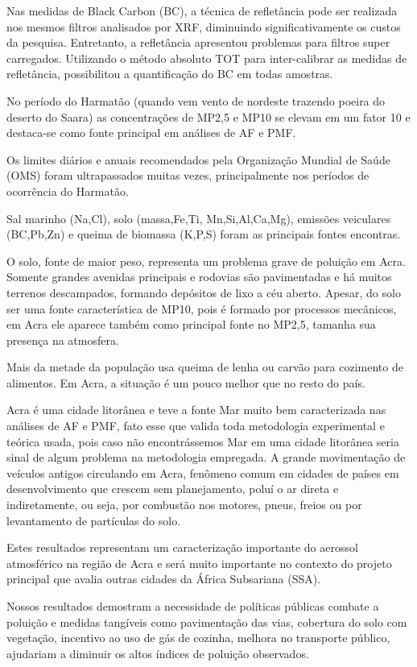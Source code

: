 Nas medidas de Black Carbon (BC), a técnica de refletância pode ser realizada nos mesmos filtros analisados por XRF, diminuindo significativamente os custos da pesquisa. Entretanto, a refletância apresentou problemas para filtros super carregados. Utilizando o método absoluto TOT para inter-calibrar as medidas de refletância, possibilitou a quantificação do BC em todas amostras. 

No período do Harmatão (quando vem vento de nordeste trazendo poeira do deserto do Saara) as concentrações de MP2,5 e MP10 se elevam em um fator 10 e destaca-se como fonte principal em análises de AF e PMF. 

Os limites diários e anuais recomendados pela Organização Mundial de Saúde (OMS) foram ultrapassados muitas vezes, principalmente nos períodos de ocorrência do Harmatão.

Sal marinho (Na,Cl), solo (massa,Fe,Ti, Mn,Si,Al,Ca,Mg), emissões veiculares (BC,Pb,Zn) e queima de biomassa (K,P,S) foram as principais fontes encontras.  

O solo, fonte de maior peso, representa um problema grave de poluição em Acra. Somente grandes avenidas principais e rodovias são pavimentadas e há muitos terrenos descampados, formando depósitos de lixo a céu aberto. Apesar, do solo ser uma fonte característica de MP10, pois é formado por processos mecânicos, em Acra ele aparece também como principal fonte no MP2,5, tamanha sua presença na atmosfera.    

Mais da metade da população usa queima de lenha ou carvão para cozimento de alimentos. Em Acra, a situação é um pouco melhor que no resto do país. 

Acra é uma cidade litorânea e teve a fonte Mar muito bem caracterizada nas análises de AF e PMF, fato esse que valida toda metodologia experimental e teórica usada, pois caso não encontrássemos Mar em uma cidade litorânea seria sinal de algum problema na metodologia empregada. 
A grande movimentação de veículos antigos circulando em Acra, fenômeno comum em cidades de países em desenvolvimento que crescem sem planejamento, poluí o ar direta e indiretamente, ou seja, por combustão nos motores, pneus, freios ou por levantamento de partículas do solo. 

Estes resultados representam um caracterização importante do aerossol atmosférico na região de Acra e será muito importante no contexto do projeto principal que avalia outras cidades da África Subsariana (SSA). 

Nossos resultados demostram a necessidade de políticas públicas combate a poluição e medidas tangíveis como pavimentação das vias, cobertura do solo com vegetação, incentivo ao uso de gás de cozinha, melhora no transporte público, ajudariam a diminuir os altos índices de poluição observados.
